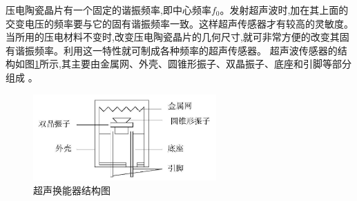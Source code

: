     \newpage
    压电陶瓷晶片有一个固定的谐振频率,即中心频率$f_0$。发射超声波时,加在其上面的交变电压的频率要与它的固有谐振频率一致。这样超声传感器才有较高的灵敏度。当所用的压电材料不变时,改变压电陶瓷晶片的几何尺寸,就可非常方便的改变其固有谐振频率。利用这一特性就可制成各种频率的超声传感器。
    超声波传感器的结构如图\ref{超声换能器结构图}所示,其主要由金属网、外壳、圆锥形振子、双晶振子、底座和引脚等部分组成 。
    \begin{figure}[!h]
    	\centering
    	\includegraphics[width=7cm]{figure/超声换能器结构图.png}
    	\caption{超声换能器结构图}
    	\label{超声换能器结构图}
    \end{figure}
\newpage
